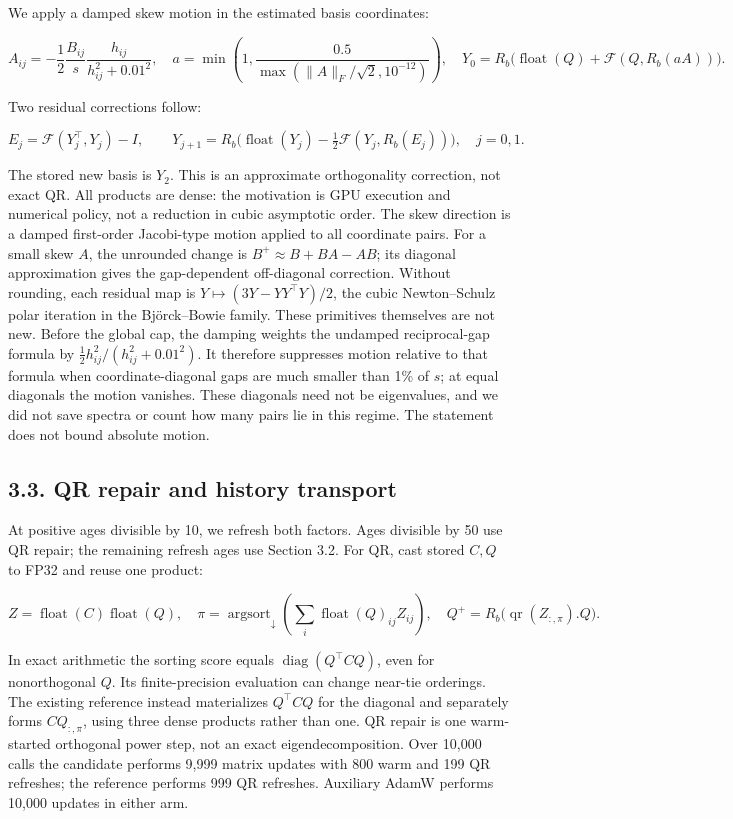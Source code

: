 \documentclass[
  10pt,
]{article}
\begin{document}
We apply a damped skew motion in the estimated basis coordinates:

\[
A_{ij}=-\frac12\frac{B_{ij}}s\frac{h_{ij}}{h_{ij}^2+0.01^2},
\quad
a=\min\left(1,\frac{0.5}{\max(\|A\|_F/\sqrt2,10^{-12})}\right),
\quad
Y_0=R_b\bigl(\operatorname{float}(Q)+\mathcal F(Q,R_b(aA))\bigr).
\]

Two residual corrections follow:

\[
E_j=\mathcal F(Y_j^\top,Y_j)-I,\qquad
Y_{j+1}=R_b\bigl(\operatorname{float}(Y_j)
 -\tfrac12\mathcal F(Y_j,R_b(E_j))\bigr),\quad j=0,1.
\]

The stored new basis is \(Y_2\). This is an approximate orthogonality
correction, not exact QR. All products are dense: the motivation is GPU
execution and numerical policy, not a reduction in cubic asymptotic
order. The skew direction is a damped first-order Jacobi-type motion
applied to all coordinate pairs. For a small skew \(A\), the unrounded
change is \(B^+\approx B+BA-AB\); its diagonal approximation gives the
gap-dependent off-diagonal correction. Without rounding, each residual
map is \(Y\mapsto(3Y-YY^\top Y)/2\), the cubic Newton--Schulz polar
iteration in the Björck--Bowie family. These primitives themselves are
not new. Before the global cap, the damping weights the undamped
reciprocal-gap formula by \(\tfrac12 h_{ij}^2/(h_{ij}^2+0.01^2)\). It
therefore suppresses motion relative to that formula when
coordinate-diagonal gaps are much smaller than 1\% of \(s\); at equal
diagonals the motion vanishes. These diagonals need not be eigenvalues,
and we did not save spectra or count how many pairs lie in this regime.
The statement does not bound absolute motion.

\hypertarget{qr-repair-and-history-transport}{%
\subsection{3.3. QR repair and history
transport}\label{qr-repair-and-history-transport}}

At positive ages divisible by 10, we refresh both factors. Ages
divisible by 50 use QR repair; the remaining refresh ages use Section
3.2. For QR, cast stored \(C,Q\) to FP32 and reuse one product:

\[
Z=\operatorname{float}(C)\operatorname{float}(Q),\quad
\pi=\operatorname{argsort}_{\downarrow}
 \left(\sum_i\operatorname{float}(Q)_{ij}Z_{ij}\right),\quad
Q^+=R_b\bigl(\operatorname{qr}(Z_{:,\pi}).Q\bigr).
\]

In exact arithmetic the sorting score equals
\(\operatorname{diag}(Q^\top C Q)\), even for nonorthogonal \(Q\). Its
finite-precision evaluation can change near-tie orderings. The existing
reference instead materializes \(Q^\top C Q\) for the diagonal and
separately forms \(CQ_{:,\pi}\), using three dense products rather than
one. QR repair is one warm-started orthogonal power step, not an exact
eigendecomposition. Over 10,000 calls the candidate performs 9,999
matrix updates with 800 warm and 199 QR refreshes; the reference
performs 999 QR refreshes. Auxiliary AdamW performs 10,000 updates in
either arm.
\end{document}
